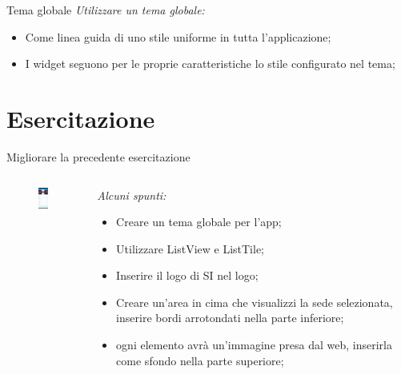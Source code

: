 \documentclass{../libs/presentation_format}
\begin{document}

\begin{frame}{Tema globale}
	\emph{Utilizzare un tema globale:}
	\begin{itemize}
		\item Come linea guida di uno stile uniforme in tutta l'applicazione;
		\item I widget seguono per le proprie caratteristiche lo stile configurato nel tema;
	\end{itemize}
	\centering
	\href{https://api.flutter.dev/flutter/material/ThemeData-class.html}{}
\end{frame}


\section{Esercitazione}
\begin{frame}{Migliorare la precedente esercitazione}
	\begin{minipage}[0.2\textheight]{\textwidth}
		\begin{columns}[T]
			\begin{column}{0.4\textwidth}
				\begin{figure}[htpb]
					\centering
					\includegraphics[width=2cm]{../libs/assignment-2-home}
				\end{figure}
			\end{column}
			\begin{column}{0.6\textwidth}
				\emph{Alcuni spunti:}
				\begin{itemize}
					\item Creare un tema globale per l'app;
					\item Utilizzare ListView e ListTile;
					\item Inserire il logo di SI nel logo;
					\item Creare un'area in cima che visualizzi la sede selezionata, inserire bordi arrotondati nella parte inferiore;
					\item ogni elemento avrà un'immagine presa dal web, inserirla come sfondo nella parte superiore;
				\end{itemize}
			\end{column}
		\end{columns}
	\end{minipage}
\end{frame}
\end{document}
